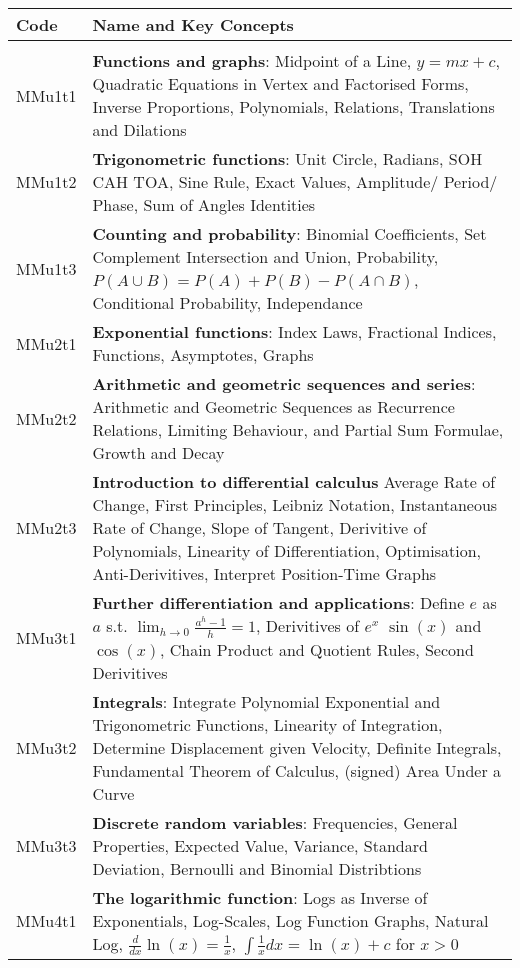 \documentclass[varwidth=144mm, 12pt]{standalone}
\begin{document}
\begin{longtable}{lp{}}
Code & \textbf{Name} and Key Concepts \\ \hline
& \\ \endhead
MMu1t1 & \textbf{Functions and graphs}: Midpoint of a Line, $y = mx + c$, Quadratic Equations in Vertex and Factorised Forms, Inverse Proportions, Polynomials, Relations, Translations and Dilations \\
MMu1t2 & \textbf{Trigonometric functions}: Unit Circle, Radians, SOH CAH TOA, Sine Rule, Exact Values, Amplitude/ Period/ Phase, Sum of Angles Identities \\
MMu1t3 & \textbf{Counting and probability}: Binomial Coefficients, Set Complement Intersection and Union, Probability, $P(A\cup{}B) = P(A) + P(B) - P(A\cap{}B)$, Conditional Probability, Independance \\
MMu2t1 & \textbf{Exponential functions}: Index Laws, Fractional Indices, Functions, Asymptotes, Graphs \\
MMu2t2 & \textbf{Arithmetic and geometric sequences and series}: Arithmetic and Geometric Sequences as Recurrence Relations, Limiting Behaviour, and Partial Sum Formulae, Growth and Decay \\
MMu2t3 & \textbf{Introduction to differential calculus} Average Rate of Change, First Principles, Leibniz Notation, Instantaneous Rate of Change, Slope of Tangent, Derivitive of Polynomials, Linearity of Differentiation, Optimisation, Anti-Derivitives, Interpret Position-Time Graphs \\
MMu3t1 & \textbf{Further differentiation and applications}: Define $e$ as $a$ s.t. $\lim_{h \to 0} \frac{a^h - 1}{h} = 1$, Derivitives of $e^x$ $\sin(x)$ and $\cos(x)$, Chain Product and Quotient Rules, Second Derivitives \\
MMu3t2 & \textbf{Integrals}: Integrate Polynomial Exponential and Trigonometric Functions, Linearity of Integration,  Determine Displacement given Velocity, Definite Integrals, Fundamental Theorem of Calculus, (signed) Area Under a Curve \\
MMu3t3 & \textbf{Discrete random variables}: Frequencies, General Properties, Expected Value, Variance, Standard Deviation, Bernoulli and Binomial Distribtions \\
MMu4t1 & \textbf{The logarithmic function}: Logs as Inverse of Exponentials, Log-Scales, Log Function Graphs, Natural Log, $\frac{d}{dx}\ln(x) = \frac{1}{x}$, $\int{\frac{1}{x}dx} = \ln(x) + c$ for $x > 0$ \\

\end{longtable}
\end{document}
